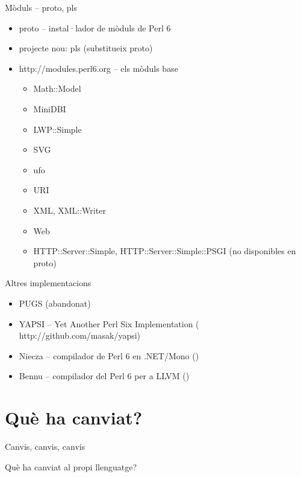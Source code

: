 \documentclass{beamer}
\begin{document}
\begin{frame}{Mòduls -- proto, pls}
	\begin{itemize}
		\item proto -- instal·lador de mòduls de Perl 6
		\item projecte nou: pls (substitueix proto)
		\item {}
			{http://modules.perl6.org} -- els mòduls base
		\begin{itemize}
			\item Math::Model
			\item MiniDBI
			\item LWP::Simple
			\item SVG
			\item ufo
			\item URI
			\item XML, XML::Writer
			\item Web
			\item HTTP::Server::Simple, HTTP::Server::Simple::PSGI (no disponibles en proto)
		\end{itemize}
	\end{itemize}
\end{frame}

\begin{frame}{Altres implementacions}
	\begin{itemize}
		\item PUGS (abandonat) %
		\item YAPSI -- Yet Another Perl Six Implementation
			(
			{http://github.com/masak/yapsi})
		\item Niecza -- compilador de Perl 6 en .NET/Mono ()
		\item Bennu -- compilador del Perl 6 per a LLVM ()
	\end{itemize}
\end{frame}
			\section{Què ha canviat?}

\begin{frame}{Canvis, canvis, canvis}
	\begin{center}
	{\huge Què ha canviat al propi llenguatge?}
	\end{center}
\end{frame}
\end{document}
